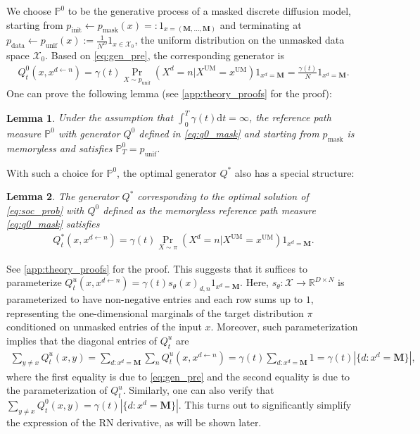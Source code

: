 \documentclass{article}
\newtheorem{lemma}{Lemma}
\theoremstyle{remark}
\renewcommand{\P}{\mathbb{P}}
\newcommand{\R}{\mathbb{R}}
\renewcommand{\d}{\mathrm{d}}
\newcommand{\cX}{\mathcal{X}}
\newcommand{\pinit}{p_\mathrm{init}}
\newcommand{\pdata}{p_\mathrm{data}}
\newcommand{\punif}{p_\mathrm{unif}}
\newcommand{\pmask}{p_\mathrm{mask}}
\newcommand{\um}{\mathrm{UM}} %
\newcommand{\mask}{\mathbf{M}}
\begin{document}
We choose $\P^0$ to be the generative process of a masked discrete diffusion model, starting from $\pinit \gets \pmask(x) =: 1_{x=(\mask,...,\mask)}$ and terminating at $\pdata \gets \punif(x) := \frac{1}{N^D}1_{x\in\cX_0}$, the uniform distribution on the unmasked data space $\cX_0$. Based on \cref{eq:gen_pre}, the corresponding generator is
\begin{align}
    Q^0_t(x,x^{d\gets n})= \gamma(t)\Pr_{X\sim\punif}(X^d=n|X^\um=x^\um)1_{x^d=\mask} = \frac{\gamma(t)}{N}1_{x^d=\mask}.
    \label{eq:q0_mask}
\end{align}
One can prove the following lemma (see \cref{app:theory_proofs} for the proof):
\begin{lemma}
    Under the assumption that $\int_0^T\gamma(t)\d t=\infty$, the reference path measure $\P^0$ with generator $Q^0$ defined in \cref{eq:q0_mask} and starting from $\pmask$ is memoryless and satisfies $\P^0_T=\punif$.
    \label{lem:memoryless}
\end{lemma}
With such a choice for $\P^0$, the optimal generator $Q^*$ also has a special structure:
\begin{lemma}
    The generator $Q^*$ corresponding to the optimal solution of \cref{eq:soc_prob} with $Q^0$ defined as the memoryless reference path measure \cref{eq:q0_mask} satisfies
    \begin{align}
    \label{eq:q_star_mask}
    Q^*_t(x,x^{d\gets n})= \gamma(t)\Pr_{X\sim\pi}(X^d=n|X^\um=x^\um)1_{x^d=\mask}.
    \end{align}
    \label{lem:q_star_mask}
%
\end{lemma}
See \cref{app:theory_proofs} for the proof. This suggests that it suffices to parameterize $Q_t^u(x,x^{d\gets n}) = \gamma(t) s_{\theta}(x)_{d,n}1_{x^d=\mask}$. Here, $s_{\theta}:\cX\to\R^{D\times N}$ is parameterized to have non-negative entries and each row sums up to $1$, representing the one-dimensional marginals of the target distribution $\pi$ conditioned on unmasked entries of the input $x$. Moreover, such parameterization implies that the diagonal entries of $Q_t^u$ are
\begin{align*}
    \sum_{y \neq x} Q_t^u(x,y) = \sum_{d:x^d=\mask}\sum_n Q_t^u(x,x^{d\gets n}) = \gamma(t)\sum_{d:x^d=\mask}1=\gamma(t)|\{d:x^d=\mask\}|,
\end{align*}
where the first equality is due to \cref{eq:gen_pre} and the second equality is due to the parameterization of $Q_t^u$. Similarly, one can also verify that $\sum_{y \neq x} Q_t^0(x,y) =\gamma(t)|\{d:x^d=\mask\}|$. This turns out to significantly simplify the expression of the RN derivative, as will be shown later.
\end{document}
